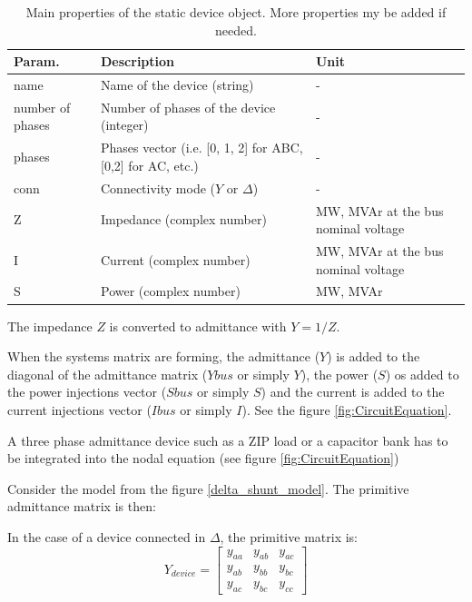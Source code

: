 \documentclass[nols,a4paper,twoside,notoc,fleqn]{tufte-book}
\begin{document}
\begin{table}[h!]
	\begin{tabular}{|p{2cm}|p{3cm}|p{4cm}|}
		\hline 
		\rowcolor{maincolor}
		{\color{white} Param.} & {\color{white} Description} & {\color{white} Unit} \\ 
		\hline 
		name & Name of the device (string) & - \\ 
		\hline 
		number of phases & Number of phases of the device (integer) & - \\ 
		\hline 
		phases & Phases vector (i.e. [0, 1, 2] for ABC, [0,2] for AC, etc.) &- \\ 
		\hline 
		conn & Connectivity mode ($Y$ or $\Delta$) & - \\ 
		\hline 
		Z & Impedance (complex number) & MW, MVAr at the bus nominal voltage \\ 
		\hline 
		I & Current (complex number) & MW, MVAr at the bus nominal voltage \\ 
		\hline 
		S & Power (complex number) & MW, MVAr \\ 
		\hline
	\end{tabular} 
	\caption{Main properties of the static device object. More properties my be added if needed.}
\end{table}

\vspace{0.5cm}

The impedance $Z$ is converted to admittance with $Y=1/Z$.

When the systems matrix are forming, the admittance ($Y$) is added to the diagonal of the admittance matrix ($Ybus$ or simply $Y$), the power ($S$) os added to the power injections vector ($Sbus$ or simply $S$) and the current is added to the current injections vector ($Ibus$ or simply $I$). See the figure \ref{fig:CircuitEquation}.

A three phase admittance device such as a ZIP load or a capacitor bank has to be integrated into the nodal equation (see figure \ref{fig:CircuitEquation})

Consider the model from the figure \ref{delta_shunt_model}. The primitive admittance matrix is then:

In the case of a device connected in $\Delta$, the primitive matrix is:
\begin{equation}
Y_{device} = \left[ \begin{array}{ccc}
y_{aa} & y_{ab} &  y_{ac} \\
y_{ab} & y_{bb} & y_{bc} \\  
y_{ac} & y_{bc} & y_{cc}
\end{array} \right] 
\end{equation}
\end{document}
